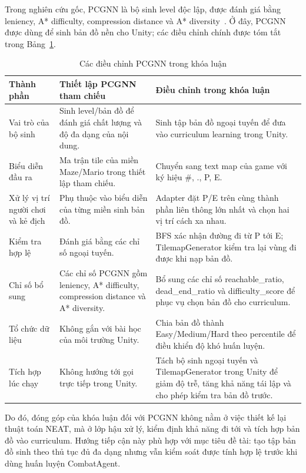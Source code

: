 Trong nghiên cứu gốc, PCGNN là bộ sinh level độc lập, được đánh giá bằng leniency, A* difficulty, compression distance và A* diversity~\cite{Beukman2022}. Ở đây, PCGNN được dùng để sinh bản đồ nền cho Unity; các điều chỉnh chính được tóm tắt trong Bảng~\ref{tab:pcgnn_improvements}.
\begin{table}[H]
    \centering
    \small
    \caption{Các điều chỉnh PCGNN trong khóa luận}
    \label{tab:pcgnn_improvements}
    \begin{tabular}{p{4.0cm} p{5.0cm} p{5.0cm}}
        \toprule
        \textbf{Thành phần} & \textbf{Thiết lập PCGNN tham chiếu} & \textbf{Điều chỉnh trong khóa luận} \\
        \midrule
        Vai trò của bộ sinh & Sinh level/bản đồ để đánh giá chất lượng và độ đa dạng của nội dung. & Sinh tập bản đồ ngoại tuyến để đưa vào curriculum learning trong Unity. \\
        Biểu diễn đầu ra & Ma trận tile của miền Maze/Mario trong thiết lập tham chiếu. & Chuyển sang text map của game với ký hiệu \#, ., P, E. \\
        Xử lý vị trí người chơi và kẻ địch & Phụ thuộc vào biểu diễn của từng miền sinh bản đồ. & Adapter đặt P/E trên cùng thành phần liên thông lớn nhất và chọn hai vị trí cách xa nhau. \\
        Kiểm tra hợp lệ & Đánh giá bằng các chỉ số ngoại tuyến. & BFS xác nhận đường đi từ P tới E; TilemapGenerator kiểm tra lại vùng đi được khi nạp bản đồ. \\
        Chỉ số bổ sung & Các chỉ số PCGNN gồm leniency, A* difficulty, compression distance và A* diversity. & Bổ sung các chỉ số reachable\_ratio, dead\_end\_ratio và difficulty\_score để phục vụ chọn bản đồ cho curriculum. \\
        Tổ chức dữ liệu & Không gắn với bài học của môi trường Unity. & Chia bản đồ thành Easy/Medium/Hard theo percentile để điều khiển độ khó huấn luyện. \\
        Tích hợp lúc chạy & Không hướng tới gọi trực tiếp trong Unity. & Tách bộ sinh ngoại tuyến và TilemapGenerator trong Unity để giảm độ trễ, tăng khả năng tái lập và cho phép kiểm tra bản đồ trước. \\
        \bottomrule
    \end{tabular}
\end{table}

Do đó, đóng góp của khóa luận đối với PCGNN không nằm ở việc thiết kế lại thuật toán NEAT, mà ở lớp hậu xử lý, kiểm định khả năng đi tới và tích hợp bản đồ vào curriculum. Hướng tiếp cận này phù hợp với mục tiêu đề tài: tạo tập bản đồ sinh theo thủ tục đủ đa dạng nhưng vẫn kiểm soát được tính hợp lệ trước khi dùng huấn luyện CombatAgent.

